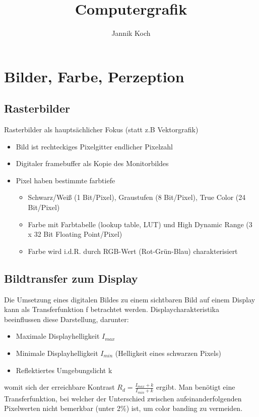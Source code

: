 \documentclass[10pt,a4paper]{article}
\author{Jannik Koch}
\title{Computergrafik}
\begin{document}
	{\let\newpage\relax\maketitle}
	\tableofcontents
	\newpage
	\setcounter{page}{1}

	\section{Bilder, Farbe, Perzeption}
	\subsection{Rasterbilder}
	Rasterbilder als hauptsächlicher Fokus (statt z.B Vektorgrafik)
	\begin{itemize}
		\item Bild ist rechteckiges Pixelgitter endlicher Pixelzahl
		\item Digitaler \Gls{framebuffer} als Kopie des Monitorbildes
		\item Pixel haben bestimmte \Gls{farbtiefe}
		\begin{itemize}
			\item Schwarz/Weiß (1 Bit/Pixel), Graustufen (8 Bit/Pixel), True Color (24 Bit/Pixel)
			\item Farbe mit Farbtabelle (\glqq lookup table, LUT\grqq) und High Dynamic Range (3 x 32 Bit Floating Point/Pixel)
			\item Farbe wird i.d.R. durch RGB-Wert (Rot-Grün-Blau) charakterisiert
		\end{itemize}
	\end{itemize}

	\subsection{Bildtransfer zum Display}
	Die Umsetzung eines digitalen Bildes zu einem sichtbaren Bild auf einem Display kann als Transferfunktion f betrachtet werden. Displaycharakteristika beeinflussen diese Darstellung, darunter:
	\begin{itemize}
		\item Maximale Displayhelligkeit $I_{max}$
		\item Minimale Displayhelligkeit $I_{min}$ (Helligkeit eines schwarzen Pixels)
		\item Reflektiertes Umgebungslicht k
	\end{itemize}
	womit sich der erreichbare Kontrast $R_d = \frac{I_{max} + k}{I_{min} + k}$ ergibt. Man benötigt eine Transferfunktion, bei welcher der Unterschied zwischen aufeinanderfolgenden Pixelwerten nicht bemerkbar (unter 2\%) ist, um \Gls{color banding} zu vermeiden.
\end{document}
